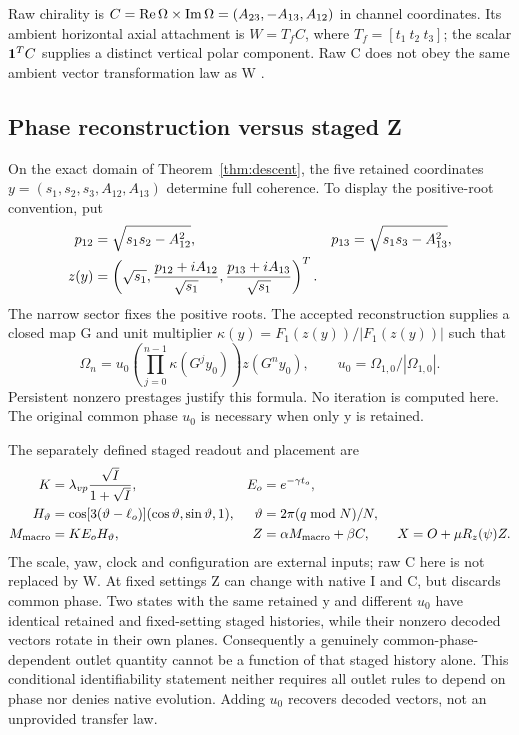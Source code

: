 Raw chirality is $C=\operatorname{Re}\Omega\times\operatorname{Im}\Omega=(A_{23},-A_{13},A_{12})$ in channel coordinates. Its ambient horizontal axial attachment is $W=T_fC$, where $T_f=[t_1\ t_2\ t_3]$; the scalar $\mathbf1^TC$ supplies a distinct vertical polar component. Raw C does not obey the same ambient vector transformation law as W \cite[state--shell attachment and observables]{nrg}.

\subsection{Phase reconstruction versus staged Z}
On the exact domain of Theorem~\ref{thm:descent}, the five retained coordinates
$y=(s_1,s_2,s_3,A_{12},A_{13})$ determine full coherence. To display the positive-root convention, put
\begin{align}
 p_{12}&=\sqrt{s_1s_2-A_{12}^2},&p_{13}&=\sqrt{s_1s_3-A_{13}^2},\notag\\
 z(y)&=\left(\sqrt{s_1},\frac{p_{12}+iA_{12}}{\sqrt{s_1}},
                         \frac{p_{13}+iA_{13}}{\sqrt{s_1}}\right)^T.\label{eq:representative}
\end{align}
The narrow sector fixes the positive roots. The accepted reconstruction \cite{potential,phase} supplies a closed map G and unit multiplier $\kappa(y)=F_1(z(y))/|F_1(z(y))|$ such that
\begin{equation}\label{eq:reconstruction}
 \Omega_n=u_0\left(\prod_{j=0}^{n-1}\kappa(G^jy_0)\right)z(G^ny_0),
 \qquad u_0=\Omega_{1,0}/|\Omega_{1,0}|.
\end{equation}
Persistent nonzero prestages justify this formula. No iteration is computed here. The original common phase $u_0$ is necessary when only y is retained.

The separately defined staged readout and placement are \cite{zmethods}
\begin{align}
 K&=\lambda_{vp}\frac{\sqrt I}{1+\sqrt I},&E_o&=e^{-\gamma t_o},\notag\\
 H_\vartheta&=\cos[3(\vartheta-\ell_o)](\cos\vartheta,\sin\vartheta,1),
 &\vartheta&=2\pi(q\bmod N)/N,\notag\\
 M_{\rm macro}&=KE_oH_\vartheta,&Z&=\alpha M_{\rm macro}+\beta C,
 \qquad X=O+\mu R_z(\psi)Z.\label{eq:Z}
\end{align}
The scale, yaw, clock and configuration are external inputs; raw C here is not replaced by W. At fixed settings Z can change with native I and C, but discards common phase. Two states with the same retained y and different $u_0$ have identical retained and fixed-setting staged histories, while their nonzero decoded vectors rotate in their own planes. Consequently a genuinely common-phase-dependent outlet quantity cannot be a function of that staged history alone. This conditional identifiability statement neither requires all outlet rules to depend on phase nor denies native evolution. Adding $u_0$ recovers decoded vectors, not an unprovided transfer law.

